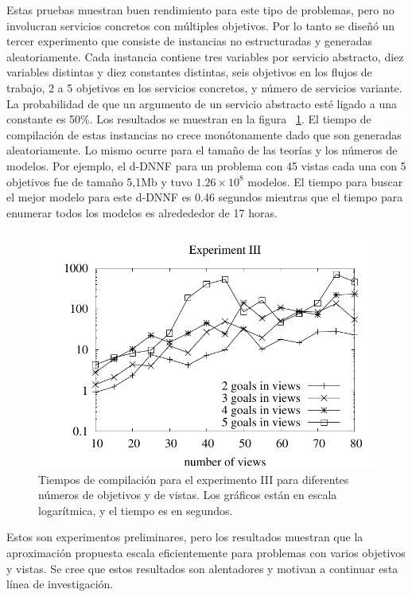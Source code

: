 Estas pruebas muestran buen rendimiento para este tipo de problemas, pero no
involucran servicios concretos con múltiples objetivos. Por lo tanto se
diseñó un tercer experimento que consiste de instancias no estructuradas y
generadas aleatoriamente. Cada instancia contiene tres variables por servicio
abstracto, diez variables distintas y diez constantes distintas, seis
objetivos en los flujos de trabajo, 2 a 5 objetivos en los servicios
concretos, y número de servicios variante. La probabilidad de que un argumento
de un servicio abstracto esté ligado a una constante es 50\%. Los resultados se
muestran en la figura ~\ref{fig:plot3}. El tiempo de compilación de estas instancias no
crece monótonamente dado que son generadas aleatoriamente. Lo mismo ocurre para
el tamaño de las teorías y los números de modelos. Por ejemplo, el d-DNNF para
un problema con 45 vistas cada una con 5 objetivos fue de tamaño 5,1Mb y tuvo
$1.26\times 10^8$ modelos. El tiempo para buscar el mejor modelo para este
d-DNNF es 0.46 segundos mientras que el tiempo para enumerar todos los modelos
es alredededor de 17 horas.

\begin{figure}[t]
\centering
\includegraphics[width=.8\textwidth]{graphics/plot3}
\caption{Tiempos de compilación para el experimento III para diferentes números
de objetivos y de vistas. Los gráficos están en escala logarítmica, y el
tiempo es en segundos.}
\label{fig:plot3}
\end{figure}

Estos son experimentos preliminares, pero los resultados muestran que la
aproximación propuesta escala eficientemente para problemas con varios objetivos
y vistas. Se cree que estos resultados son alentadores y motivan a continuar
esta línea de investigación.
